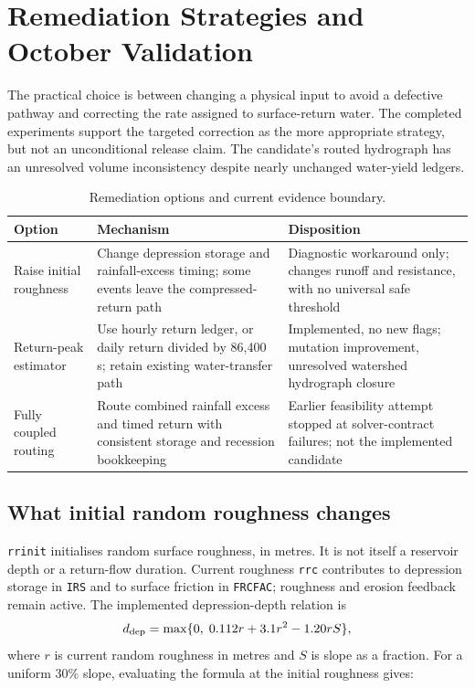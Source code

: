 \section{Remediation Strategies and October Validation}
\label{sec:remediation}

The practical choice is between changing a physical input to avoid a defective
pathway and correcting the rate assigned to surface-return water. The completed
experiments support the targeted correction as the more appropriate strategy,
but not an unconditional release claim. The candidate's routed hydrograph has
an unresolved volume inconsistency despite nearly unchanged water-yield ledgers.

\begin{table}[H]
\centering\small
\caption{Remediation options and current evidence boundary.}
\begin{tabular}{p{}p{}p{}}
\toprule
Option & Mechanism & Disposition \\
\midrule
Raise initial roughness & Change depression storage and rainfall-excess timing;
some events leave the compressed-return path & Diagnostic workaround only;
changes runoff and resistance, with no universal safe threshold \\
Return-peak estimator & Use hourly return ledger, or daily return divided by
86,400 s; retain existing water-transfer path & Implemented, no new flags;
mutation improvement, unresolved watershed hydrograph closure \\
Fully coupled routing & Route combined rainfall excess and timed return with
consistent storage and recession bookkeeping & Earlier feasibility attempt
stopped at solver-contract failures; not the implemented candidate \\
\bottomrule
\end{tabular}
\end{table}

\subsection{What initial random roughness changes}

\texttt{rrinit} initialises random surface roughness, in metres. It is not
itself a reservoir depth or a return-flow duration. Current roughness
\texttt{rrc} contributes to depression storage in \texttt{IRS} and to surface
friction in \texttt{FRCFAC}; roughness and erosion feedback remain active.
The implemented depression-depth relation is
\begin{equation}
d_{\rm dep}=\max\{0,\;0.112r+3.1r^2-1.20rS\},
\end{equation}
where $r$ is current random roughness in metres and $S$ is slope as a fraction.
For a uniform 30\% slope, evaluating the formula at the initial roughness gives:

